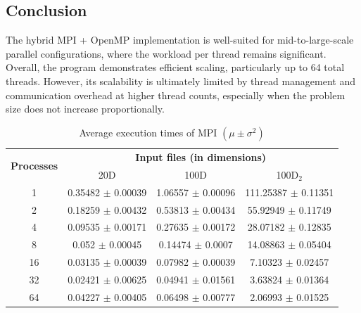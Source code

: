 \documentclass[11pt, journal]{IEEEtran}
\begin{document}
\subsection{Conclusion}

The hybrid MPI + OpenMP implementation is well-suited for mid-to-large-scale parallel configurations, where the workload per thread remains significant. Overall, the program demonstrates efficient scaling, particularly up to 64 total threads. However, its scalability is ultimately limited by thread management and communication overhead at higher thread counts, especially when the problem size does not increase proportionally.




\begin{table}
    \renewcommand{\arraystretch}{1.3}
    \caption{Average execution times of MPI $\left(\mu \pm \sigma^2\right)$}
    \label{mpi_timings_table}
    \centering
    \begin{tabular}{|c||c|c|c|}
    \hline
    \multirow{2}{*}{\textbf{Processes}} & \multicolumn{3}{c|}{\textbf{Input files (in dimensions)}} \\\cline{2-4}
     & 20D & 100D & 100D$_2$ \\
    \hline\hline
    1 & 0.35482 $\pm$ 0.00039 & 1.06557 $\pm$ 0.00096 & 111.25387 $\pm$ 0.11351 \\
    \cline{2-4} 
    2 & 0.18259 $\pm$ 0.00432 & 0.53813 $\pm$ 0.00434 & 55.92949 $\pm$ 0.11749 \\
    \cline{2-4} 
    4 & 0.09535 $\pm$ 0.00171 & 0.27635 $\pm$ 0.00172 & 28.07182 $\pm$ 0.12835 \\
    \cline{2-4} 
    8 & 0.052 $\pm$ 0.00045 & 0.14474 $\pm$ 0.0007 & 14.08863 $\pm$ 0.05404 \\
    \cline{2-4} 
    16 & 0.03135 $\pm$ 0.00039 & 0.07982 $\pm$ 0.00039 & 7.10323 $\pm$ 0.02457 \\
    \cline{2-4} 
    32 & 0.02421 $\pm$ 0.00625 & 0.04941 $\pm$ 0.01561 & 3.63824 $\pm$ 0.01364 \\
    \cline{2-4} 
    64 & 0.04227 $\pm$ 0.00405 & 0.06498 $\pm$ 0.00777 & 2.06993 $\pm$ 0.01525 \\
    \hline
    \end{tabular}
\end{table}
\end{document}
